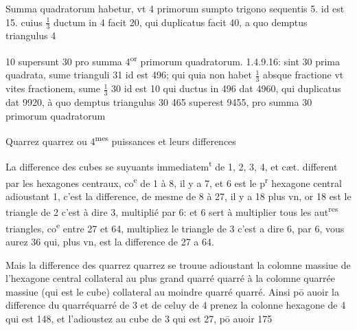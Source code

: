 \documentclass[11pt,a4paper]{article}
\begin{document}
Summa quadratorum habetur, vt 4 primorum sumpto trigono sequentis 5. id est 15. cuius $\frac{1}{3}$ ductum in 4 facit 20, qui duplicatus facit 40, a quo demptus triangulus 4



10 supersunt 30 pro summa 4\textsuperscript{or} primorum quadratorum. 1.4.9.16: sint 30 prima quadrata, sume trianguli 31 id est 496; qui quia non habet $\frac{1}{3}$ absque fractione vt vites fractionem, sume $\frac{1}{3}$ 30 id est 10 qui ductus in 496 dat 4960, qui duplicatus dat 9920, à quo demptus triangulus 30  465 superest 9455, pro summa 30 primorum quadratorum

Quarrez quarrez ou  4\textsuperscript{mes} puissances et leurs differences

La difference des cubes se suyuants immediatem\textsuperscript{t} de 1, 2, 3, 4, et cæt. different par les hexagones centraux, co\textsuperscript{e} de 1 à 8, il y a 7, et 6 est le p\textsuperscript{r} hexagone central adioustant 1, c'est la difference, de mesme de 8 à 27, il y a 18 plus vn, or 18 est le triangle de \struck{\ill{}} 2 c'est à dire 3, multiplié par 6: et 6 sert à multiplier tous les aut\textsuperscript{res} triangles, co\textsuperscript{e} entre 27 et 64, multipliez le triangle de 3 c'est a dire 6, par 6, vous aurez 36 qui, plus vn, est la difference de 27 a 64.

Mais la difference des quarrez quarrez se trouue adioustant la colomne massiue de l'hexagone central collateral au plus grand quarré quarré à la colomne quarrée massiue (qui est le cube) collateral au moindre quarré quarré. Ainsi pō auoir la difference du quarréquarré de 3 et de celuy de 4 prenez la colonne hexagone de 4 qui est 148, et l'adioustez au cube de 3 qui est 27, pō auoir 175
\end{document}
